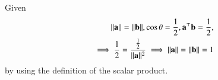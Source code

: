 Given 
\begin{align}
	\lVert\mathbf{a}\rVert= \lVert\mathbf{b}\rVert, {\cos\theta} = \frac{1}{2}, 
	\mathbf{a}^{\top}{\mathbf{b}} = \frac{1}{2},  \\
\implies 
	\frac{1}{2} = \frac{\frac{1}{2}}{\lVert\mathbf{a}\rVert^2}
\implies \lVert\mathbf{a}\rVert
= \lVert\mathbf{b}\rVert=1
\end{align}
by using  the definition of the scalar product.

